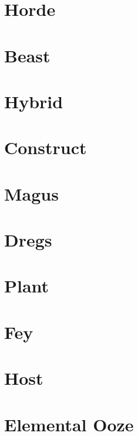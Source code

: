 \documentclass{tufte-book}
\begin{document}
\chapter{Horde}

\chapter{Beast}

\chapter{Hybrid}

\chapter{Construct}

\chapter{Magus} %

\chapter{Dregs}

\chapter{Plant}

\chapter{Fey}

\chapter{Host}

\chapter{Elemental Ooze}















\backmatter





\printindex
\end{document}
